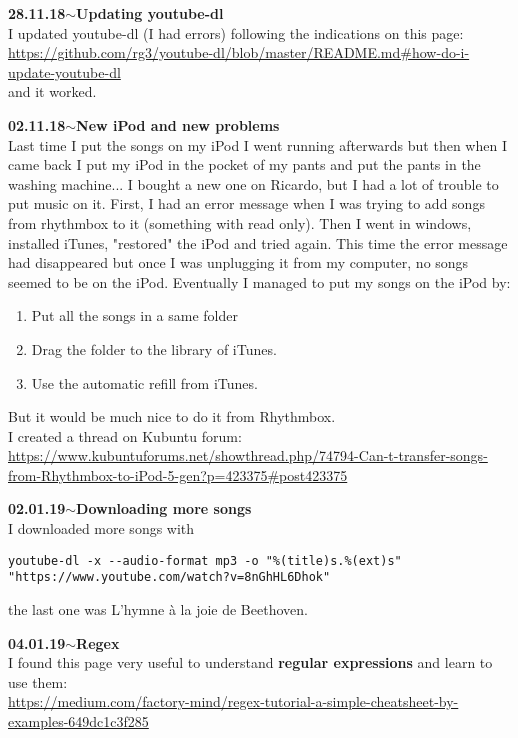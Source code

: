 \documentclass[11pt,a4paper]{article}
\newenvironment{loggentry}[2]%
{\noindent\textbf{#1}\hspace{1cm}$\mathbf{\sim}$\text{ }\textbf{#2}\\}{\vspace{0.5cm}}
\begin{document}
\begin{loggentry}{28.11.18}{Updating youtube-dl}
I updated youtube-dl (I had errors) following the indications on this page:\\
\url{https://github.com/rg3/youtube-dl/blob/master/README.md#how-do-i-update-youtube-dl}\\
and it worked.
\end{loggentry}

\begin{loggentry}{02.11.18}{New iPod and new problems}
Last time I put the songs on my iPod I went running afterwards but then when I came back I put my iPod in the pocket of my pants and put the pants in the washing machine...
I bought a new one on Ricardo, but I had a lot of trouble to put music on it. First, I had an error message when I was trying to add songs from rhythmbox to it (something with read only). Then I went in windows, installed iTunes, "restored" the iPod and tried again. This time the error message had disappeared but once I was unplugging it from my computer, no songs seemed to be on the iPod. Eventually I managed to put my songs on the iPod by:
\begin{enumerate}
\item Put all the songs in a same folder
\item Drag the folder to the library of iTunes.
\item Use the automatic refill from iTunes.
\end{enumerate}
But it would be much nice to do it from Rhythmbox.\\
I created a thread on Kubuntu forum:\\
\url{https://www.kubuntuforums.net/showthread.php/74794-Can-t-transfer-songs-from-Rhythmbox-to-iPod-5-gen?p=423375#post423375}\\
\end{loggentry}

\begin{loggentry}{02.01.19}{Downloading more songs}
I downloaded more songs with
\begin{verbatim}
youtube-dl -x --audio-format mp3 -o "%(title)s.%(ext)s" "https://www.youtube.com/watch?v=8nGhHL6Dhok"
\end{verbatim}
the last one was L'hymne à la joie de Beethoven.
\end{loggentry}

\begin{loggentry}{04.01.19}{Regex}
I found this page very useful to understand \textbf{regular expressions} and learn to use them:\\
\url{https://medium.com/factory-mind/regex-tutorial-a-simple-cheatsheet-by-examples-649dc1c3f285}\\
\end{loggentry}
\end{document}
